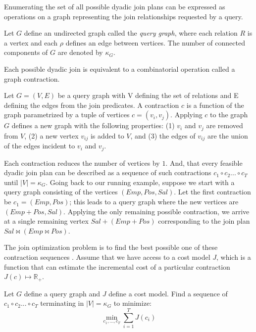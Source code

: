 Enumerating the set of all possible dyadic join plans can be expressed as operations on a graph representing the join relationships requested by a query.

\begin{definition}
Let $G$ define an undirected graph called the \emph{query graph}, where each relation $R$ is a vertex and each $\rho$ defines an edge between vertices. The number of connected components of $G$ are denoted by $\kappa_G$.
\end{definition}

Each possible dyadic join is equivalent to a combinatorial operation called a graph contraction.

\begin{definition}[Contraction]
Let $G = (V,E)$ be a query graph with V defining the set of relations and E defining the edges from the join predicates. A contraction $c$ is a function of the graph parametrized by a tuple of vertices $c=(v_i, v_j)$. Applying $c$ to the graph $G$ defines a new graph with the following properties: (1) $v_i$ and $v_j$ are removed from $V$, (2) a new vertex $v_{ij}$ is added to $V$, and (3) the edges of $v_{ij}$ are the union of the edges incident to $v_i$ and $v_j$. 
\end{definition}

Each contraction reduces the number of vertices by $1$.  And, that every feasible dyadic join plan can be described as a sequence of such contractions $c_1 \circ c_2 ...\circ c_{T}$ until $|V| = \kappa_G$. Going back to our running example, suppose we start with a query graph consisting of the vertices $(Emp, Pos, Sal)$. Let the first contraction be $c_1 = (Emp, Pos)$; this leads to a query graph where the new vertices are $(Emp+Pos, Sal)$.  Applying the only remaining possible contraction, we arrive at a single remaining vertex $Sal+(Emp+Pos)$ corresponding to the join plan $Sal \bowtie (Emp \bowtie Pos)$. 

The join optimization problem is to find the best possible one of these contraction sequences . Assume that we have access to a cost model $J$, which is a function that can estimate the incremental cost of a particular contraction $J(c) \mapsto \mathbb{R}_+$. 

\begin{problem}
Let $G$ define a query graph and $J$ define a cost model. Find a sequence of $c_1 \circ c_2 ...\circ c_{T}$ terminating in $|V| = \kappa_G$ to minimize:
\[
\min_{c_1,...,c_T} \sum_{i=1}^T J(c_i)
\]\label{joinopt}
\end{problem}

